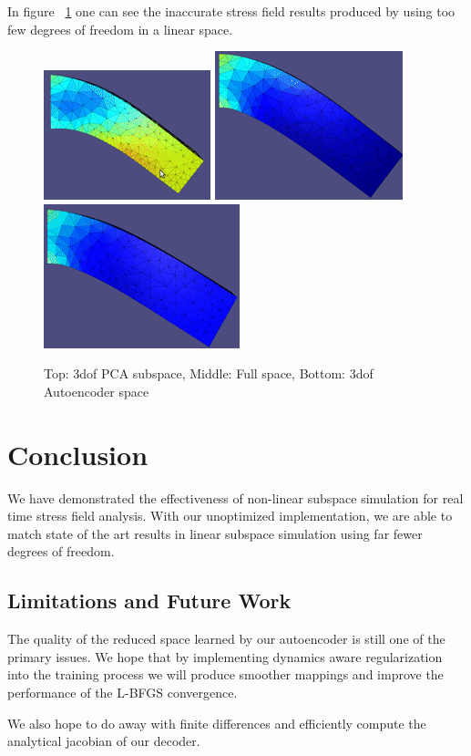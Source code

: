 \documentclass[sigconf, authorversion, review]{acmart}
\begin{document}
In figure ~\ref{fig:distortion} one can see the inaccurate stress field results produced by using too few degrees of freedom in a linear space.

\begin{figure}[ht!]
\includegraphics[width=.25\textwidth]{figures/distortion-example}
\includegraphics[width=.25\textwidth]{figures/no-distortion-full}\hfill
\includegraphics[width=.25\textwidth]{figures/no-distortion-ae}
\caption{Top: 3dof PCA subspace, Middle: Full space, Bottom: 3dof Autoencoder space }
\label{fig:distortion}
\end{figure}

\section{Conclusion}\label{sec:conclusion}
We have demonstrated the effectiveness of non-linear subspace simulation for real time stress field analysis. With our unoptimized implementation, we are able to match state of the art results in linear subspace simulation using far fewer degrees of freedom.

\subsection{Limitations and Future Work}
The quality of the reduced space learned by our autoencoder is still one of the primary issues. We hope that by implementing dynamics aware regularization into the training process we will produce smoother mappings and improve the performance of the L-BFGS convergence.

We also hope to do away with finite differences and efficiently compute the analytical jacobian of our decoder.




\end{document}
